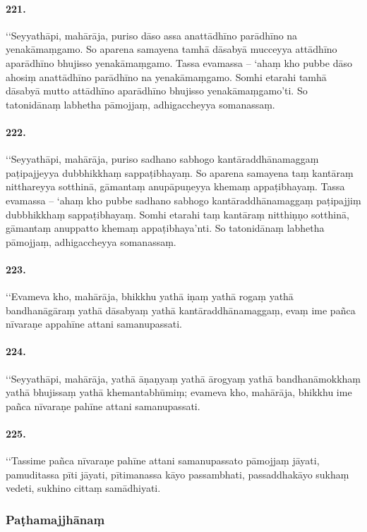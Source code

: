\paragraph{221.} ‘‘Seyyathāpi, mahārāja, puriso dāso assa anattādhīno parādhīno na yenakāmaṃgamo. So aparena samayena tamhā dāsabyā mucceyya attādhīno aparādhīno bhujisso yenakāmaṃgamo. Tassa evamassa – ‘ahaṃ kho pubbe dāso ahosiṃ anattādhīno parādhīno na yenakāmaṃgamo. Somhi etarahi tamhā dāsabyā mutto attādhīno aparādhīno bhujisso yenakāmaṃgamo’ti. So tatonidānaṃ labhetha pāmojjaṃ, adhigaccheyya somanassaṃ.

\paragraph{222.} ‘‘Seyyathāpi, mahārāja, puriso sadhano sabhogo kantāraddhānamaggaṃ paṭipajjeyya dubbhikkhaṃ sappaṭibhayaṃ. So aparena samayena taṃ kantāraṃ nitthareyya sotthinā, gāmantaṃ anupāpuṇeyya khemaṃ appaṭibhayaṃ. Tassa evamassa – ‘ahaṃ kho pubbe sadhano sabhogo kantāraddhānamaggaṃ paṭipajjiṃ dubbhikkhaṃ sappaṭibhayaṃ. Somhi etarahi taṃ kantāraṃ nitthiṇṇo sotthinā, gāmantaṃ anuppatto khemaṃ appaṭibhaya’nti. So tatonidānaṃ labhetha pāmojjaṃ, adhigaccheyya somanassaṃ.

\paragraph{223.} ‘‘Evameva kho, mahārāja, bhikkhu yathā iṇaṃ yathā rogaṃ yathā bandhanāgāraṃ yathā dāsabyaṃ yathā kantāraddhānamaggaṃ, evaṃ ime pañca nīvaraṇe appahīne attani samanupassati.

\paragraph{224.} ‘‘Seyyathāpi, mahārāja, yathā āṇaṇyaṃ yathā ārogyaṃ yathā bandhanāmokkhaṃ yathā bhujissaṃ yathā khemantabhūmiṃ; evameva kho, mahārāja, bhikkhu ime pañca nīvaraṇe pahīne attani samanupassati.

\paragraph{225.} ‘‘Tassime pañca nīvaraṇe pahīne attani samanupassato pāmojjaṃ jāyati, pamuditassa pīti jāyati, pītimanassa kāyo passambhati, passaddhakāyo sukhaṃ vedeti, sukhino cittaṃ samādhiyati.

\subsubsection{Paṭhamajjhānaṃ}

